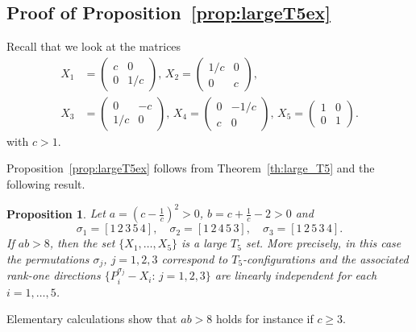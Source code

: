 \documentclass[titlepage]{amsart}
\numberwithin{equation}{section}
\theoremstyle{plain}
\newtheorem{proposition}[equation]{Proposition}
\theoremstyle{definition}
\theoremstyle{remark}
\begin{document}
\subsection{Proof of Proposition~\ref{prop:largeT5ex}}   \label{sec:largeT5ex}
Recall that we look at the matrices 
\begin{equation*}
\begin{split}
X_1&=\begin{pmatrix} c&0\\0&1/c\end{pmatrix},\, 
X_2=\begin{pmatrix} 1/c&0\\0&c\end{pmatrix},\\
X_3&=\begin{pmatrix} 0&-c\\1/c&0\end{pmatrix},\,
X_4=\begin{pmatrix} 0 &-1/c\\ c & 0\end{pmatrix},\,
X_5=\begin{pmatrix} 1&0\\0&1\end{pmatrix}.	
\end{split}
\end{equation*}
with $c > 1$. 

Proposition~\ref{prop:largeT5ex} follows from Theorem~\ref{th:large_T5} and the following result.

\begin{proposition}\label{T5p:ex}
Let  $a=(c-\tfrac1c)^2>0$,  $b=c+\tfrac1c-2>0$ and
\begin{equation*}
\sigma_1=[1\, 2\, 3\, 5\, 4],\quad 	\sigma_2=[1\, 2\, 4\, 5\, 3],\quad 	\sigma_3=[1\, 2\, 5\, 3\, 4].
\end{equation*}
If $ab>8$, then the set $\{X_1,\dots,X_5\}$ is a large $T_5$ set. More precisely, in this case the permutations $\sigma_j$, $j=1,2,3$ correspond
to $T_5$-configurations and the associated rank-one directions $\{P_i^{\sigma_j}-X_i:\,j=1,2,3\}$ are linearly independent for each $i=1,\dots,5$.
\end{proposition}
Elementary calculations show that $ab>8$ holds for instance if $c\geq 3$.
\end{document}
